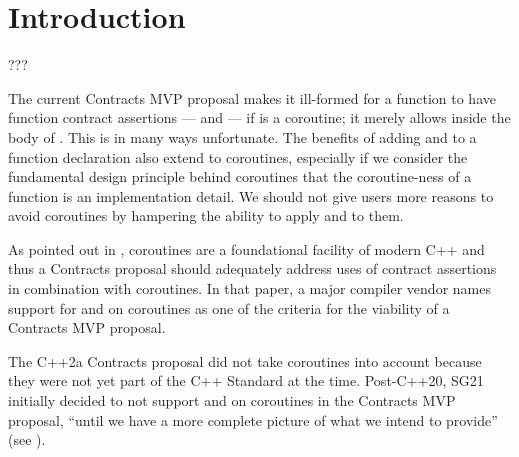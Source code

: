 
\tableofcontents*





\section{Introduction}
\label{intro}

???

The current Contracts MVP proposal \cite{P2900R8} makes it ill-formed for a function  to have function contract assertions ---  and  --- if  is a coroutine; it merely allows  inside the body of . This is in many ways unfortunate. The benefits of adding  and  to a function declaration also extend to coroutines, especially if we consider the fundamental design principle behind coroutines  that the coroutine-ness of a function is an implementation detail. We should not give users more reasons to avoid coroutines by hampering the ability to apply  and  to them.

As pointed out in \cite{P3173R0}, coroutines are a foundational facility of modern C++ and thus a Contracts proposal should adequately address uses of contract assertions in combination with coroutines. In that paper, a major compiler vendor names support for  and  on coroutines as one of the criteria for the viability of a Contracts MVP proposal.

The C++2a Contracts proposal \cite{P0542R5} did not take coroutines into account because they were not yet part of the C++ Standard at the time. Post-C++20, SG21 initially decided to not support  and  on coroutines in the Contracts MVP proposal, ``until we have a more complete picture of what we intend to provide'' (see \cite{P2932R3}).

